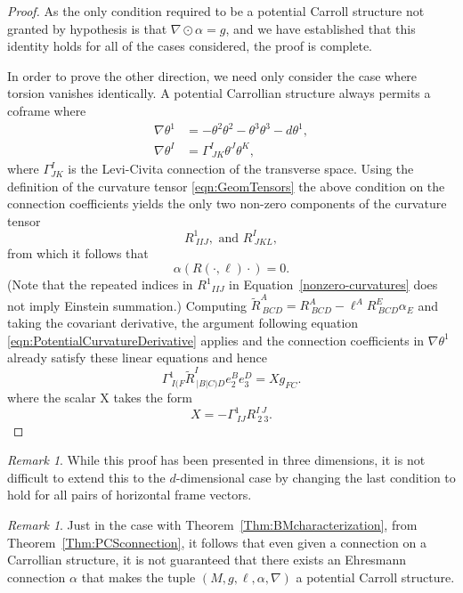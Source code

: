 \documentclass{article}
\newcommand{\ai}{A}
\newcommand{\bb}{B}
\newcommand{\cc}{C}
\newcommand{\dd}{D}
\newcommand{\eee}{E}
\newcommand{\ff}{F}
\newcommand{\ii}{I}
\newcommand{\jj}{J}
\newcommand{\kk}{K}
\newcommand{\li}{L}
\theoremstyle{definition}
\theoremstyle{remark}
\newtheorem{remark}[theorem]{Remark}
\begin{document}
\begin{proof}
    As the only condition required to be a potential Carroll structure not granted by hypothesis is that $\nabla \odot \alpha = g$, and we have established that this identity holds for all of the cases considered, the proof is complete.

    In order to prove the other direction, we need only consider the case where torsion vanishes identically. A potential Carrollian structure always permits a coframe where 
    \begin{equation}
        \begin{aligned}
            \nabla \theta^1 &= - \theta^2 \theta^2 - \theta^3 \theta ^3 - d \theta^1, \\
            \nabla \theta^\ii &= \Gamma^\ii_{~\jj\kk} \theta^\jj \theta^\kk,
        \end{aligned}
    \end{equation}
    \noindent where $\Gamma^\ii_{\jj\kk}$ is the Levi-Civita connection of the transverse space. Using the definition of the curvature tensor \eqref{eqn:GeomTensors} the above condition on the connection coefficients yields the only two non-zero components of the curvature tensor
    \begin{equation} \label{nonzero-curvatures}
        R^1_{~\ii\ii\jj}, \text{ and } R^\ii_{~\jj\kk\li}, 
    \end{equation}
    \noindent from which it follows that $$\alpha(R(\cdot, \ell)\cdot) = 0. $$ (Note that the repeated indices in $R^1{}_{IIJ}$ in Equation~\ref{nonzero-curvatures} does not imply Einstein summation.)
    Computing $\tilde{R}^\ai_{~\bb\cc\dd} = R^\ai_{~\bb\cc\dd} - \ell^\ai R^\eee_{~\bb\cc\dd}\alpha_\eee$ and taking the covariant derivative, the argument following equation \eqref{eqn:PotentialCurvatureDerivative} applies and the connection coefficients in $\nabla \theta^1$ already satisfy these linear equations and hence  $$ \Gamma^1_{~\ii(\ff}\tilde{R}^\ii_{~|\bb|\cc)\dd}e_2^\bb e_3^\dd = X g_{\ff\cc}. $$ where the scalar X takes the form    $$ X = - \Gamma^1_{~\ii\jj}R^{\ii~\jj}_{~2~3}.$$
\end{proof}


\begin{remark}
    While this proof has been presented in three dimensions, it is not difficult to extend this to the $d$-dimensional case by changing the last condition to hold for all pairs of horizontal frame vectors.  
\end{remark}

\begin{remark}
    Just in the case with Theorem~\ref{Thm:BMcharacterization}, from Theorem~\ref{Thm:PCSconnection}, it follows that even given a connection on a Carrollian structure, it is not guaranteed that there exists an Ehresmann connection $\alpha$ that makes the tuple $(M,g,\ell,\alpha,\nabla)$ a potential Carroll structure.
\end{remark}
\end{document}
